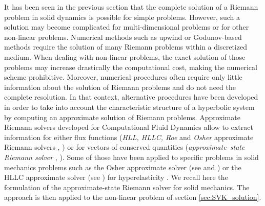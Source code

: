 It has been seen in the previous section that the complete solution of a Riemann problem in solid dynamics is possible for simple problems. However, such a solution may become complicated for multi-dimensional problems or for other non-linear problems. 
Numerical methods such as upwind or Godunov-based methods \cite{Leveque} require the solution of many Riemann problems within a discretized medium. When dealing with non-linear problems, the exact solution of those problems may increase drastically the computational cost, making the numerical scheme prohibitive. Moreover, numerical procedures often require only little information about the solution of Riemann problems and do not need the complete resolution. In that context, alternative procedures have been developed in order to take into account the characteristic structure of a hyperbolic system by computing an approximate solution of Riemann problems. Approximate Riemann solvers developed for Computational Fluid Dynamics allow to extract information for either flux functions (\textit{HLL, HLLC, Roe} and \textit{Osher} approximate Riemann solvers \cite{Trangenstein}, \cite{Toro}) or for vectors of conserved quantities (\textit{approximate--state Riemann solver} \cite[Ch.9]{Toro}, \cite[Ch.22]{Leveque}). Some of those have been applied to specific problems in solid mechanics problems such as the Osher approximate solver (see \cite{LEE_FVM} and \cite{Haider_FVM}) or the HLLC approximate solver (see \cite{Ortega_HLLD}) for hyperelasticity . We recall here the formulation of the approximate-state Riemann solver for solid mechanics. The approach is then applied to the non-linear problem of section \ref{sec:SVK_solution}.

